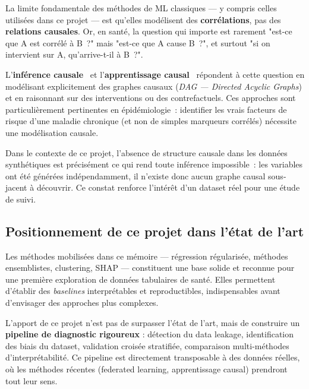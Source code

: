 La limite fondamentale des méthodes de ML classiques --- y compris celles utilisées dans ce projet --- est qu'elles modélisent des \textbf{corrélations}, pas des \textbf{relations causales}. Or, en santé, la question qui importe est rarement "est-ce que A est corrélé à B~?" mais "est-ce que A cause B~?", et surtout "si on intervient sur A, qu'arrive-t-il à B~?".

L'\textbf{inférence causale}~\cite{pearl2009} et l'\textbf{apprentissage causal}~\cite{scholkopf2021} répondent à cette question en modélisant explicitement des graphes causaux (\textit{DAG --- Directed Acyclic Graphs}) et en raisonnant sur des interventions ou des contrefactuels. Ces approches sont particulièrement pertinentes en épidémiologie~: identifier les vrais facteurs de risque d'une maladie chronique (et non de simples marqueurs corrélés) nécessite une modélisation causale.

Dans le contexte de ce projet, l'absence de structure causale dans les données synthétiques est précisément ce qui rend toute inférence impossible~: les variables ont été générées indépendamment, il n'existe donc aucun graphe causal sous-jacent à découvrir. Ce constat renforce l'intérêt d'un dataset réel pour une étude de suivi.

\subsection{Positionnement de ce projet dans l'état de l'art}

Les méthodes mobilisées dans ce mémoire --- régression régularisée, méthodes ensemblistes, clustering, SHAP --- constituent une base solide et reconnue pour une première exploration de données tabulaires de santé. Elles permettent d'établir des \textit{baselines} interprétables et reproductibles, indispensables avant d'envisager des approches plus complexes.

L'apport de ce projet n'est pas de surpasser l'état de l'art, mais de construire un \textbf{pipeline de diagnostic rigoureux} : détection du data leakage, identification des biais du dataset, validation croisée stratifiée, comparaison multi-méthodes d'interprétabilité. Ce pipeline est directement transposable à des données réelles, où les méthodes récentes (federated learning, apprentissage causal) prendront tout leur sens.
